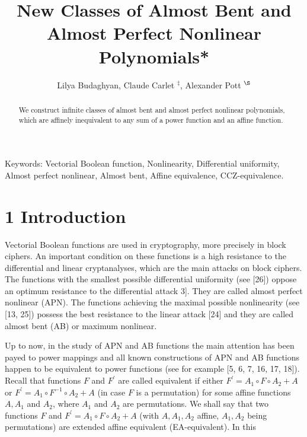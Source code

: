 \documentclass[10pt]{article}
\title{New Classes of Almost Bent and Almost Perfect Nonlinear Polynomials* }
\author{Lilya Budaghyan, Claude Carlet ${ }^{\ddagger}$, Alexander Pott ${ }^{\S}$}
\date{}
\begin{document}
\maketitle
\captionsetup{singlelinecheck=false}


\begin{abstract}
We construct infinite classes of almost bent and almost perfect nonlinear polynomials, which are affinely inequivalent to any sum of a power function and an affine function.
\end{abstract}

Keywords: Vectorial Boolean function, Nonlinearity, Differential uniformity, Almost perfect nonlinear, Almost bent, Affine equivalence, CCZ-equivalence.

\section*{1 Introduction}
Vectorial Boolean functions are used in cryptography, more precisely in block ciphers. An important condition on these functions is a high resistance to the differential and linear cryptanalyses, which are the main attacks on block ciphers. The functions with the smallest possible differential uniformity (see [26]) oppose an optimum resistance to the differential attack 3]. They are called almost perfect nonlinear (APN). The functions achieving the maximal possible nonlinearity (see [13, 25]) possess the best resistance to the linear attack [24] and they are called almost bent (AB) or maximum nonlinear.

Up to now, in the study of APN and AB functions the main attention has been payed to power mappings and all known constructions of APN and AB functions happen to be equivalent to power functions (see for example [5, 6, 7, 16, 17, 18]). Recall that functions $F$ and $F^{\prime}$ are called equivalent if either $F^{\prime}=A_{1} \circ F \circ A_{2}+A$ or $F^{\prime}=A_{1} \circ F^{-1} \circ A_{2}+A$ (in case $F$ is a permutation) for some affine functions $A, A_{1}$ and $A_{2}$, where $A_{1}$ and $A_{2}$ are permutations. We shall say that two functions $F$ and $F^{\prime}=A_{1} \circ F \circ A_{2}+A$ (with $A, A_{1}, A_{2}$ affine, $A_{1}, A_{2}$ being permutations) are extended affine equivalent (EA-equivalent). In this
\end{document}
